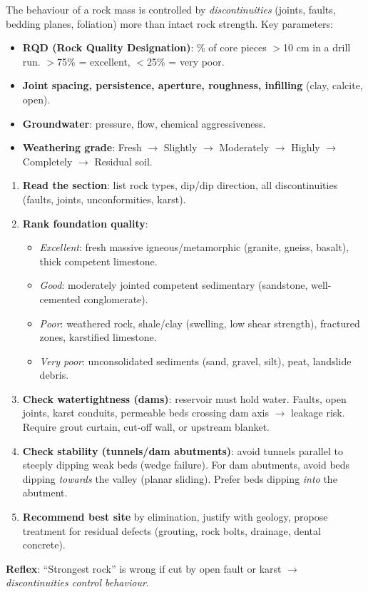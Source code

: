 \documentclass[11pt]{article}
\begin{document}
\begin{propriete}
The behaviour of a rock mass is controlled by \emph{discontinuities} (joints, faults, bedding planes, foliation) more than intact rock strength. Key parameters:
\begin{itemize}
\item \textbf{RQD (Rock Quality Designation)}: \% of core pieces $>$10 cm in a drill run. $>$75\% = excellent, $<$25\% = very poor.
\item \textbf{Joint spacing, persistence, aperture, roughness, infilling} (clay, calcite, open).
\item \textbf{Groundwater}: pressure, flow, chemical aggressiveness.
\item \textbf{Weathering grade}: Fresh $\rightarrow$ Slightly $\rightarrow$ Moderately $\rightarrow$ Highly $\rightarrow$ Completely $\rightarrow$ Residual soil.
\end{itemize}
\end{propriete}

\begin{methode}
\begin{enumerate}
\item \textbf{Read the section}: list rock types, dip/dip direction, all discontinuities (faults, joints, unconformities, karst).
\item \textbf{Rank foundation quality}:
\begin{itemize}
\item \emph{Excellent}: fresh massive igneous/metamorphic (granite, gneiss, basalt), thick competent limestone.
\item \emph{Good}: moderately jointed competent sedimentary (sandstone, well-cemented conglomerate).
\item \emph{Poor}: weathered rock, shale/clay (swelling, low shear strength), fractured zones, karstified limestone.
\item \emph{Very poor}: unconsolidated sediments (sand, gravel, silt), peat, landslide debris.
\end{itemize}
\item \textbf{Check watertightness (dams)}: reservoir must hold water. Faults, open joints, karst conduits, permeable beds crossing dam axis $\rightarrow$ leakage risk. Require grout curtain, cut-off wall, or upstream blanket.
\item \textbf{Check stability (tunnels/dam abutments)}: avoid tunnels parallel to steeply dipping weak beds (wedge failure). For dam abutments, avoid beds dipping \emph{towards} the valley (planar sliding). Prefer beds dipping \emph{into} the abutment.
\item \textbf{Recommend best site} by elimination, justify with geology, propose treatment for residual defects (grouting, rock bolts, drainage, dental concrete).
\end{enumerate}
\textbf{Reflex}: ``Strongest rock'' is wrong if cut by open fault or karst $\rightarrow$ \emph{discontinuities control behaviour}.
\end{methode}
\end{document}
